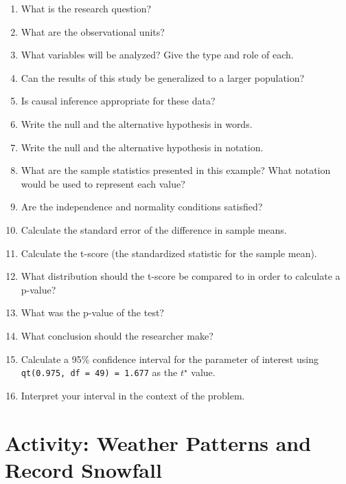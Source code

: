 \documentclass[
]{report}
\newcommand{\rgs}{\vspace{12pt}} %
\begin{document}
\begin{enumerate}
\def\labelenumi{\arabic{enumi}.}
\item
  What is the research question?
  \rgs
\item
  What are the observational units?
  \rgs
\item
  What variables will be analyzed? Give the type and role of each.
  \rgs
  \rgs
\item
  Can the results of this study be generalized to a larger population?
  \rgs
\item
  Is causal inference appropriate for these data?
  \rgs
\item
  Write the null and the alternative hypothesis in words.
  \rgs
  \rgs
\item
  Write the null and the alternative hypothesis in notation.
  \rgs
\item
  What are the sample statistics presented in this example? What notation would be used to represent each value?
  \rgs
\item
  Are the independence and normality conditions satisfied?
  \rgs
  \rgs
\item
  Calculate the standard error of the difference in sample means.
  \rgs
\item
  Calculate the t-score (the standardized statistic for the sample mean).
  \rgs
\item
  What distribution should the t-score be compared to in order to calculate a p-value?
  \rgs
\item
  What was the p-value of the test?
  \rgs
\item
  What conclusion should the researcher make?
  \rgs
\item
  Calculate a 95\% confidence interval for the parameter of interest using \texttt{qt(0.975,\ df\ =\ 49)\ =\ 1.677} as the \(t^\star\) value.
  \rgs
\item
  Interpret your interval in the context of the problem.
  \rgs
  \rgs
\end{enumerate}

\newpage

\hypertarget{activity-weather-patterns-and-record-snowfall}{%
\section{Activity: Weather Patterns and Record Snowfall}\label{activity-weather-patterns-and-record-snowfall}}

\end{document}
